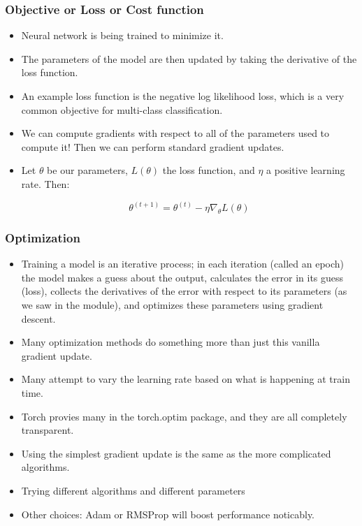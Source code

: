 \begin{frame}[fragile]
\frametitle{Objective or Loss or Cost function}

\begin{itemize}
\item Neural network is being trained to minimize it.
\item The parameters of the model are then updated by taking the derivative of the loss function. 
\item An example loss function is the negative log likelihood loss, which is a very common objective for multi-class classification.
\item We can compute gradients with respect to all of the parameters used to compute it! Then we can perform standard gradient updates.
\item Let $\theta$ be our parameters,  $L(\theta)$ the loss function, and $\eta$ a positive learning rate. Then:

$$ \theta^{(t+1)} = \theta^{(t)} - \eta \nabla_\theta L(\theta) $$
\end{itemize}

\end{frame} 

\begin{frame}[fragile]
\frametitle{Optimization}

\begin{itemize}
\item Training a model is an iterative process; in each iteration (called an epoch) the model makes a guess about the output, calculates the error in its guess (loss), collects the derivatives of the error with respect to its parameters (as we saw in the module), and optimizes these parameters using gradient descent.
\item Many optimization methods do something more than just this vanilla gradient update.
\item Many attempt to vary the learning rate based on what is happening at train time. 
\item Torch provies many in the torch.optim package, and they are all completely transparent. 
\item Using the simplest gradient update is the same as the more complicated algorithms. 
\item Trying different algorithms and different parameters 
\item Other choices: Adam or RMSProp will boost performance noticably.
\end{itemize}

\end{frame} 

